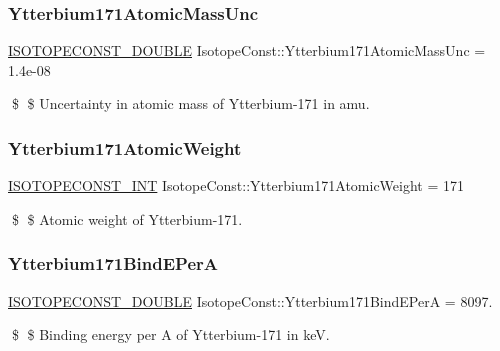 \subsubsection{\texorpdfstring{Ytterbium171\+Atomic\+Mass\+Unc}{Ytterbium171AtomicMassUnc}}
{\footnotesize\ttfamily \mbox{\hyperlink{group___isotope_const-_macros_ga8f45a7272ce02c0b4c65c44636ed719a}{I\+S\+O\+T\+O\+P\+E\+C\+O\+N\+S\+T\+\_\+\+D\+O\+U\+B\+LE}} Isotope\+Const\+::\+Ytterbium171\+Atomic\+Mass\+Unc = 1.\+4e-\/08}

\$ \$ Uncertainty in atomic mass of Ytterbium-\/171 in amu. \mbox{\label{group___isotope_const-_ytterbium-_yb171_ga59d7755cb91eeafb3258ecc1adc7a1a5}} 
\subsubsection{\texorpdfstring{Ytterbium171\+Atomic\+Weight}{Ytterbium171AtomicWeight}}
{\footnotesize\ttfamily \mbox{\hyperlink{group___isotope_const-_macros_ga5f18360b3e99483a35c32d789e62621c}{I\+S\+O\+T\+O\+P\+E\+C\+O\+N\+S\+T\+\_\+\+I\+NT}} Isotope\+Const\+::\+Ytterbium171\+Atomic\+Weight = 171}

\$ \$ Atomic weight of Ytterbium-\/171. \mbox{\label{group___isotope_const-_ytterbium-_yb171_ga181f043136910e9b78bb3b80ab748821}} 
\subsubsection{\texorpdfstring{Ytterbium171\+Bind\+E\+PerA}{Ytterbium171BindEPerA}}
{\footnotesize\ttfamily \mbox{\hyperlink{group___isotope_const-_macros_ga8f45a7272ce02c0b4c65c44636ed719a}{I\+S\+O\+T\+O\+P\+E\+C\+O\+N\+S\+T\+\_\+\+D\+O\+U\+B\+LE}} Isotope\+Const\+::\+Ytterbium171\+Bind\+E\+PerA = 8097.}

\$ \$ Binding energy per A of Ytterbium-\/171 in keV. \mbox{\label{group___isotope_const-_ytterbium-_yb171_ga7dd61d47bacc57ffa619cb8e0260cee3}} 
